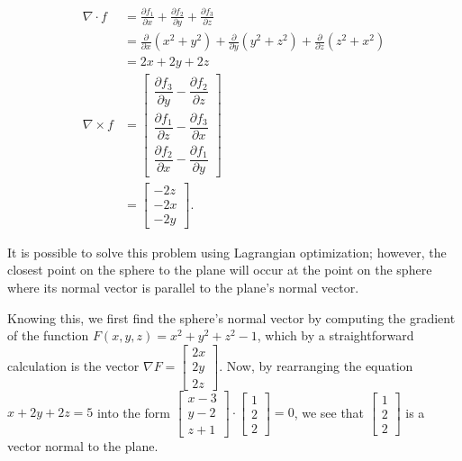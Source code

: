 \begin{align*}
 \nabla \cdot f &= \frac{\partial f_1}{\partial x} + \frac{\partial f_2}{\partial y} + \frac{\partial f_3}{\partial z} \\
 &= \frac{\partial}{\partial x}(x^2+y^2) + \frac{\partial}{\partial y}(y^2+z^2) + \frac{\partial}{\partial z}(z^2+x^2) \\
 &= 2x + 2y + 2z \\
 \nabla \times f &= \begin{bmatrix}
  \dfrac{\partial f_3}{\partial y} - \dfrac{\partial f_2}{\partial z} \\
  \dfrac{\partial f_1}{\partial z} - \dfrac{\partial f_3}{\partial x} \\
  \dfrac{\partial f_2}{\partial x} - \dfrac{\partial f_1}{\partial y}
 \end{bmatrix} \\
 &= \begin{bmatrix} - 2z \\ - 2x \\ - 2y \end{bmatrix}.
\end{align*}


\item

It is possible to solve this problem using Lagrangian optimization;
however, the closest point on the sphere to the plane will occur at
the point on the sphere where its normal vector is parallel to the plane's
normal vector.


Knowing this, we first find the sphere's normal vector by computing
the gradient of the function $F(x,y,z) = x^2 + y^2 + z^2 - 1$, which by
a straightforward calculation is the vector
$\nabla F = \begin{bmatrix} 2x \\ 2y \\ 2z \end{bmatrix}$.  Now, by
rearranging the equation $x + 2y + 2z = 5$ into the form
$\begin{bmatrix} x - 3 \\ y -2 \\ z + 1 \end{bmatrix} \cdot
 \begin{bmatrix} 1 \\ 2 \\ 2 \end{bmatrix} = 0$, we see that
$\begin{bmatrix} 1 \\ 2 \\ 2 \end{bmatrix}$ is a vector normal to the plane.

